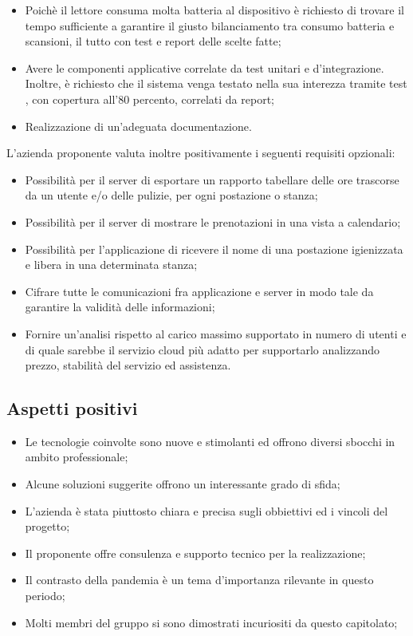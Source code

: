 \begin{itemize}
\item Poichè il lettore  consuma molta batteria al dispositivo è richiesto di trovare il tempo sufficiente a garantire il giusto bilanciamento tra consumo batteria e scansioni, il tutto con test e report delle scelte fatte;
\item Avere le componenti applicative correlate da test unitari e d’integrazione. Inoltre, è richiesto che il sistema venga testato nella sua interezza tramite test , con copertura all'80 percento, correlati da report;
\item Realizzazione di un'adeguata documentazione.
\end{itemize}

L’azienda proponente valuta inoltre positivamente i seguenti requisiti opzionali:
\begin{itemize}    
\item Possibilità per il server di esportare un rapporto tabellare delle ore trascorse da un utente e/o delle pulizie, per ogni postazione o stanza;
\item Possibilità per il server di mostrare le prenotazioni in una vista a calendario;
\item Possibilità per l'applicazione di ricevere il nome di una postazione igienizzata e libera in una determinata stanza; 
\item Cifrare tutte le comunicazioni fra applicazione e server in modo tale da garantire la validità delle informazioni;
\item Fornire un’analisi rispetto al carico massimo supportato in numero di utenti e di quale sarebbe il servizio cloud più adatto per supportarlo analizzando prezzo, stabilità  del servizio ed assistenza.
\end{itemize}

\subsection{Aspetti positivi}
\begin{itemize}
\item Le tecnologie coinvolte sono nuove e stimolanti ed offrono diversi sbocchi in ambito professionale;
\item Alcune soluzioni suggerite offrono un interessante grado di sfida;
\item L'azienda è stata piuttosto chiara e precisa sugli obbiettivi ed i vincoli del progetto;
\item Il proponente offre consulenza e supporto tecnico per la realizzazione;
\item Il contrasto della pandemia è un tema d'importanza rilevante in questo periodo;
\item Molti membri del gruppo si sono dimostrati incuriositi da questo capitolato;

\end{itemize}

